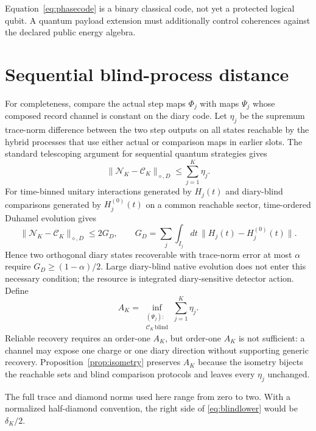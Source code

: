 \documentclass[11pt]{article}
\newcommand{\cC}{\mathcal C}
\newcommand{\cN}{\mathcal N}
\begin{document}
Equation~\eqref{eq:phasecode} is a binary classical code, not yet a protected
logical qubit.  A quantum payload extension must additionally control
coherences against the declared public energy algebra.

\section{Sequential blind-process distance}
\label{app:comb}

For completeness, compare the actual step maps $\Phi_j$ with maps $\Psi_j$
whose composed record channel is constant on the diary code.  Let $\eta_j$ be
the supremum trace-norm difference between the two step outputs on all states
reachable by the hybrid processes that use either actual or comparison maps
in earlier slots.  The standard telescoping argument for sequential quantum
strategies \citep{GutoskiWatrous,GutoskiStrategy} gives
\begin{equation}
  \|\cN_K-\cC_K\|_{\diamond,D}
  \leq \sum_{j=1}^K\eta_j.
  \label{eq:hybrid}
\end{equation}
For time-binned unitary interactions generated by $H_j(t)$ and diary-blind
comparisons generated by $H_j^{(0)}(t)$ on a common reachable sector,
time-ordered Duhamel evolution gives
\begin{equation}
  \|\cN_K-\cC_K\|_{\diamond,D}
  \leq 2G_D,
  \qquad
  G_D=\sum_j\int_{I_j}\!dt\,
  \|H_j(t)-H_j^{(0)}(t)\|.
  \label{eq:detectoraction}
\end{equation}
Hence two orthogonal diary states recoverable with trace-norm error at most
$\alpha$ require $G_D\geq(1-\alpha)/2$.  Large diary-blind native evolution
does not enter this necessary condition; the resource is integrated
diary-sensitive detector action.
Define
\begin{equation}
  A_K=\inf_{\substack{(\Psi_j):\\
                      \cC_K\,\mathrm{blind}}}
      \sum_{j=1}^K\eta_j.
  \label{eq:AK}
\end{equation}
Reliable recovery requires an order-one $A_K$, but order-one $A_K$ is not
sufficient: a channel may expose one charge or one diary direction without
supporting generic recovery.  Proposition~\ref{prop:isometry} preserves
$A_K$ because the isometry bijects the reachable sets and blind comparison
protocols and leaves every $\eta_j$ unchanged.

The full trace and diamond norms used here range from zero to two.  With a
normalized half-diamond convention, the right side of
\eqref{eq:blindlower} would be $\delta_K/2$.

\begingroup
\raggedright


\endgroup
\end{document}
